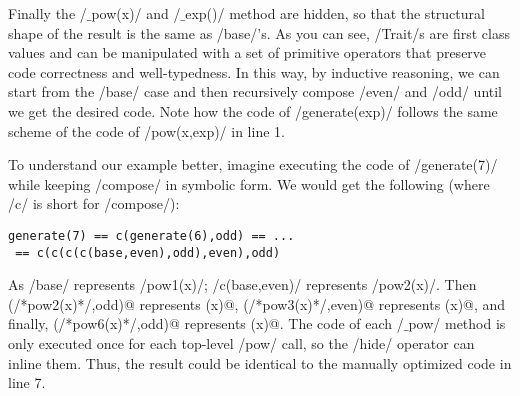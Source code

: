 Finally the /$\_$pow(x)/ and /$\_$exp()/ method are hidden, so that the structural shape of the result is
the same as /base/'s.
As you can see, /Trait/s are first class values and can be manipulated with a set of primitive operators that preserve code correctness and well-typedness.
In this way, by inductive reasoning, we can start from the /base/ case and then recursively compose /even/ and /odd/ until we get the desired code.
Note how the code of /generate(exp)/ follows the same scheme of the code of /pow(x,exp)/ in line 1.

To understand our example better, imagine executing the code of /generate(7)/ while keeping /compose/ in symbolic form. We would get the following (where /c/ is short for /compose/):
\vspace{-1ex}
\begin{lstlisting}[numbers=none]
generate(7) == c(generate(6),odd) == ...
 == c(c(c(c(base,even),odd),even),odd)
\end{lstlisting}
\vspace{-1ex}
As /base/ represents /pow1(x)/; /c(base,even)/ represents /pow2(x)/. Then \Q@c(/*pow2(x)*/,odd)@ represents (x)@, \Q@c(/*pow3(x)*/,even)@ represents (x)@, and finally,
\Q@c(/*pow6(x)*/,odd)@ represents (x)@.
The code of each /$\_$pow/ method is only executed once for each top-level /pow/ call, so the /hide/ operator can inline them.
Thus, the result could be identical to the manually optimized code in line 7.


